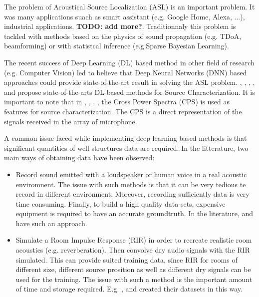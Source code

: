 \documentclass{article}
\begin{document}
The problem of Acoustical Source Localization (ASL) is an important problem. It was many applications suach as smart assistant (e.g. Google Home, Alexa, ...), industrial applications, \textbf{TODO: add more?}. Traditionnaly this problem is tackled with methods based on the physics of sound propagation (e.g. TDoA, beamforming) or with statistcal inference (e.g.Sparse Bayesian Learning). 

The recent success of Deep Learning (DL) based method in other field of research (e.g. Computer Vision) led to believe that Deep Neural Networks (DNN) based approaches could provide state-of-the-art result in solving the ASL problem. \cite{castellini2021neural}, \cite{kujawski2019deep}, \cite{lee2021deep}, \cite{ma2019phased}, \cite{pinto2021deconvoluting} and \cite{xu2021deep} propose state-of-the-arts DL-based methods for Source Characterization. It is important to note that in \cite{castellini2021neural}, \cite{lee2021deep}, \cite{ma2019phased}, \cite{xu2021deep}, the Cross Power Spectra (CPS) is used as features for source characterization. The CPS is a direct representation of the signals received in the array of microphone.

A common issue faced while implementing deep learning based methods is that significant quantities of well structures data are required. In the litterature, two main ways of obtaining data have been observed:

\begin{itemize}
    \item Record sound emitted with a loudspeaker or human voice in a real acoustic enviromnent. The issue with such methods is that it can be very tedious te record in different environment. Moreover, recording sufficiently data is very time consuming. Finally, to build a high quality data sets, expensive equipment is required to have an accurate groundtruth. In the literature, \cite{he2018deep} and \cite{ferguson2018sound} have such an approach.
    \item Simulate a Room Impulse Response (RIR) in order to recreate realistic room acoustics (e.g. reverberation). Then convolve dry audio signals with the RIR simulated. This can provide suited training data, since RIR for rooms of different size, different source prosition as well as different dry signals can be used for the training. The issue with such a method is the important amount of time and storage required. E.g. \cite{chakrabarty2017broadband}, \cite{perotin2018crnn} and \cite{adavanne2018direction} created their datasets in this way.
\end{itemize}
\end{document}
